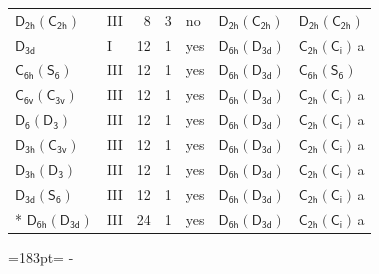 \documentclass[10pt,a4paper]{article}
\newcommand{\needspace}[1]{\par\penalty-100\begingroup\dimen0=#1\relax\dimen2=\pagegoal
  \advance\dimen2-\pagetotal\ifdim\dimen0>\dimen2\relax\ifdim\dimen2>0pt\vfil\break\fi\fi
  \endgroup}
\numberwithin{equation}{section}
\newcommand{\grp}[1]{\mathsf{#1}}
\newcommand{\clsletter}[1]{\,{\scriptsize\color{black!55}#1}}
\begin{document}
{\begin{longtable}{@{}llrrlll@{}}
\href{D2h-C2h.pdf}{$\grp{D_{2h}}(\grp{C_{2h}})$} & III & 8 & 3 & no & \href{D2h-C2h.pdf}{$\grp{D_{2h}}(\grp{C_{2h}})$} & \href{D2h-C2h.pdf}{$\grp{D_{2h}}(\grp{C_{2h}})$}\\
\href{../../../rotation/data/pdf/D3d.pdf}{$\grp{D_{3d}}$} & I & 12 & 1 & yes & \href{D6h-D3d.pdf}{$\grp{D_{6h}}(\grp{D_{3d}})$} & \href{C2h-S2.pdf}{$\grp{C_{2h}}(\grp{C_{i}})$}\clsletter{a}\\
\href{C6h-S6.pdf}{$\grp{C_{6h}}(\grp{S_{6}})$} & III & 12 & 1 & yes & \href{D6h-D3d.pdf}{$\grp{D_{6h}}(\grp{D_{3d}})$} & \href{C6h-S6.pdf}{$\grp{C_{6h}}(\grp{S_{6}})$}\\
\href{C6v-C3v.pdf}{$\grp{C_{6v}}(\grp{C_{3v}})$} & III & 12 & 1 & yes & \href{D6h-D3d.pdf}{$\grp{D_{6h}}(\grp{D_{3d}})$} & \href{C2h-S2.pdf}{$\grp{C_{2h}}(\grp{C_{i}})$}\clsletter{a}\\
\href{D6-D3.pdf}{$\grp{D_{6}}(\grp{D_{3}})$} & III & 12 & 1 & yes & \href{D6h-D3d.pdf}{$\grp{D_{6h}}(\grp{D_{3d}})$} & \href{C2h-S2.pdf}{$\grp{C_{2h}}(\grp{C_{i}})$}\clsletter{a}\\
\href{D3h-C3v.pdf}{$\grp{D_{3h}}(\grp{C_{3v}})$} & III & 12 & 1 & yes & \href{D6h-D3d.pdf}{$\grp{D_{6h}}(\grp{D_{3d}})$} & \href{C2h-S2.pdf}{$\grp{C_{2h}}(\grp{C_{i}})$}\clsletter{a}\\
\href{D3h-D3.pdf}{$\grp{D_{3h}}(\grp{D_{3}})$} & III & 12 & 1 & yes & \href{D6h-D3d.pdf}{$\grp{D_{6h}}(\grp{D_{3d}})$} & \href{C2h-S2.pdf}{$\grp{C_{2h}}(\grp{C_{i}})$}\clsletter{a}\\
\href{D3d-S6.pdf}{$\grp{D_{3d}}(\grp{S_{6}})$} & III & 12 & 1 & yes & \href{D6h-D3d.pdf}{$\grp{D_{6h}}(\grp{D_{3d}})$} & \href{C2h-S2.pdf}{$\grp{C_{2h}}(\grp{C_{i}})$}\clsletter{a}\\*
\href{D6h-D3d.pdf}{$\grp{D_{6h}}(\grp{D_{3d}})$} & III & 24 & 1 & yes & \href{D6h-D3d.pdf}{$\grp{D_{6h}}(\grp{D_{3d}})$} & \href{C2h-S2.pdf}{$\grp{C_{2h}}(\grp{C_{i}})$}\clsletter{a}\\
\bottomrule\end{longtable}}
\needspace{183pt}
\end{document}
